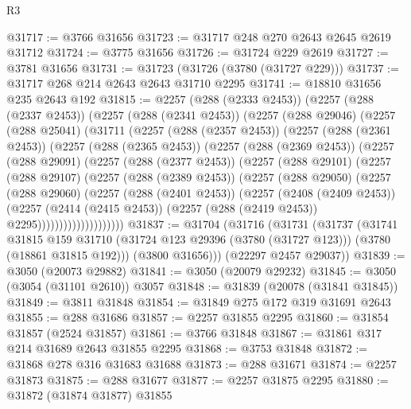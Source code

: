 \begin{lexlean}{R3}
\begin{coremodule}
@31717 := @3766 @31656
@31723 := @31717 @248 @270 @2643 @2645 @2619 @31712
@31724 := @3775 @31656
@31726 := @31724 @229 @2619
@31727 := @3781 @31656
@31731 := @31723 (@31726 (@3780 (@31727 @229)))
@31737 := @31717 @268 @214 @2643 @2643 @31710 @2295
@31741 := @18810 @31656 @235 @2643 @192
@31815 := @2257
    (@288 (@2333 @2453))
    (@2257
      (@288 (@2337 @2453))
      (@2257
        (@288 (@2341 @2453))
        (@2257
          (@288 @29046)
          (@2257
            (@288 @25041)
            (@31711
              (@2257
                (@288 (@2357 @2453))
                (@2257
                  (@288 (@2361 @2453))
                  (@2257
                    (@288 (@2365 @2453))
                    (@2257
                      (@288 (@2369 @2453))
                      (@2257
                        (@288 @29091)
                        (@2257
                          (@288 (@2377 @2453))
                          (@2257
                            (@288 @29101)
                            (@2257
                              (@288 @29107)
                              (@2257
                                (@288 (@2389 @2453))
                                (@2257
                                  (@288 @29050)
                                  (@2257
                                    (@288 @29060)
                                    (@2257
                                      (@288 (@2401 @2453))
                                      (@2257
                                        (@2408 (@2409 @2453))
                                        (@2257
                                          (@2414 (@2415 @2453))
                                          (@2257 (@288 (@2419 @2453)) @2295))))))))))))))))))))
@31837 := @31704
    (@31716
      (@31731
        (@31737
          (@31741
            @31815
            @159
            @31710
            (@31724 @123 @29396 (@3780 (@31727 @123)))
            (@3780 (@18861 @31815 @192)))
          (@3800 @31656)))
      (@22297 @2457 @29037))
@31839 := @3050 (@20073 @29882)
@31841 := @3050 (@20079 @29232)
@31845 := @3050 (@3054 (@31101 @2610)) @3057
@31848 := @31839 (@20078 (@31841 @31845))
@31849 := @3811 @31848
@31854 := @31849 @275 @172 @319 @31691 @2643
@31855 := @288 @31686
@31857 := @2257 @31855 @2295
@31860 := @31854 @31857 (@2524 @31857)
@31861 := @3766 @31848
@31867 := @31861 @317 @214 @31689 @2643 @31855 @2295
@31868 := @3753 @31848
@31872 := @31868 @278 @316 @31683 @31688
@31873 := @288 @31671
@31874 := @2257 @31873
@31875 := @288 @31677
@31877 := @2257 @31875 @2295
@31880 := @31872 (@31874 @31877) @31855

\end{coremodule}
\end{lexlean}
